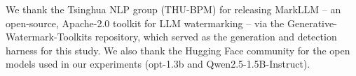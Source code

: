 
We thank the Tsinghua NLP group (THU-BPM) for releasing MarkLLM
\citep{pan2024markllm} -- an open-source, Apache-2.0 toolkit for LLM
watermarking -- via the Generative-Watermark-Toolkits repository, which
served as the generation and detection harness for this study. We also
thank the Hugging Face community for the open models used in our
experiments (opt-1.3b and Qwen2.5-1.5B-Instruct).
